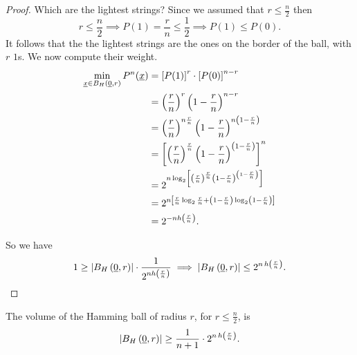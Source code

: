 \begin{proof}
	Which are the lightest strings?
	Since we assumed that $r \leq \frac{n}{2}$ then
	\begin{equation*}
		r \le \frac{n}{2}
		\implies
		P(1) = \frac{r}{n} \le \frac{1}{2}
		\implies
		P(1) \le P(0).
	\end{equation*}
	It follows that the the lightest strings are the ones on the border of the ball, with $r$ $1$s. We now compute their weight.
	\begin{align*}
		\min_{\underline{x} \in B_H\left(\underline{0}, r\right)} P^n(\underline{x})
		& =
		\left[P(1)\right]^r \cdot \left[P(0)\right]^{n-r}
		\\
		& =
		\left(\frac{r}{n}\right)^r \left(1 - \frac{r}{n}\right)^{n-r}
		\\
		& =
		\left(\frac{r}{n}\right)^{n\frac{r}{n}} \left(1 - \frac{r}{n}\right)^{n\left(1 - \frac{r}{n}\right)}
		\\
		& =
		\left[\left(\frac{r}{n}\right)^{\frac{r}{n}} \left(1 - \frac{r}{n}\right)^{\left(1 - \frac{r}{n}\right)}\right]^n
		\\
		& =
		2^{n\log_2\left[\left(\frac{r}{n}\right)^{\frac{r}{n}}  \left(1 - \frac{r}{n}\right)^{\left(1 - \frac{r}{n}\right)}\right]}
		\\
		& =
		2^{n\left[\frac{r}{n}\log_2\frac{r}{n} + \left(1 - \frac{r}{n}\right)\log_2\left(1 - \frac{r}{n}\right)\right]}
		\\
		& =
		2^{-nh\left(\frac{r}{n}\right)}.
	\end{align*}

	So we have 
	\begin{equation*}
		1
		\geq
		\left|{B_H\left(\underline{0}, r\right)}\right| \cdot \frac{1}{2^{nh\left(\frac{r}{n}\right)}}
		\implies
		\left|{B_H\left(\underline{0}, r\right)}\right| \le 2^{n \, h\left(\frac{r}{n}\right)}.
	\end{equation*}
\end{proof}

\begin{thm}
	The volume of the Hamming ball of radius $r$, for $ r \leq \frac{n}{2}$, is
	\begin{equation*}
		\left|{B_H\left(\underline{0}, r\right)}\right|
		\ge
		\frac{1}{n+1} \cdot 2^{n \, h\left(\frac{r}{n}\right)}.
	\end{equation*}
\end{thm}

